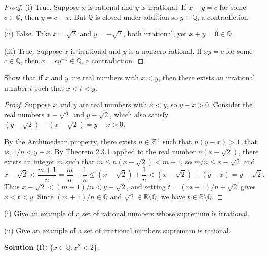\begin{proof}
    (i) True. Suppose $x$ is rational and $y$ is irrational.
    If $x + y = c$ for some $c \in \mathbb{Q}$, then $y = c - x$.
    But $\mathbb{Q}$ is closed under addition so $y \in \mathbb{Q}$, a contradiction.

    (ii) False. Take $x = \sqrt{2}$ and $y = -\sqrt{2}$, both irrational, yet $x + y = 0 \in \mathbb{Q}$.

    (iii) True. Suppose $x$ is irrational and $y$ is a nonzero rational.
    If $xy = c$ for some $c \in \mathbb{Q}$, then $x = c y^{-1} \in \mathbb{Q}$,
    a contradiction.
\end{proof}

\newpage
\begin{tcolorbox}[title=Problem 3, breakable]
    Show that if $x$ and $y$ are real numbers with $x < y$, then there exists 
    an irrational number $t$ such that $x < t < y$.
\end{tcolorbox}

\begin{proof}
    Suppose $x$ and $y$ are real numbers with $x < y$, so $y - x > 0$.
    Consider the real numbers $x - \sqrt{2}$ and $y - \sqrt{2}$, which also
    satisfy $(y - \sqrt{2}) - (x - \sqrt{2}) = y - x > 0$.

    By the Archimedean property, there exists $n \in \mathbb{Z}^+$ such that
    $n(y - x) > 1$, that is, $1/n < y - x$. By Theorem 2.3.1 applied to the
    real number $n(x - \sqrt{2})$, there exists an integer $m$ such that
    $m \le n(x - \sqrt{2}) < m + 1$, so $m/n \le x - \sqrt{2}$ and
    \[
        x - \sqrt{2} < \frac{m+1}{n} = \frac{m}{n} + \frac{1}{n}
        \le (x - \sqrt{2}) + \frac{1}{n} < (x - \sqrt{2}) + (y - x)
        = y - \sqrt{2}.
    \]
    Thus $x - \sqrt{2} < (m+1)/n < y - \sqrt{2}$, and setting
    $t = (m+1)/n + \sqrt{2}$ gives $x < t < y$. Since $(m+1)/n \in \mathbb{Q}$
    and $\sqrt{2} \in \mathbb{R} \setminus \mathbb{Q}$, we have
    $t \in \mathbb{R} \setminus \mathbb{Q}$.
\end{proof}

\begin{tcolorbox}[title=Problem 4, breakable]
    (i)  Give an example of a set of rational numbers whose supremum is irrational.

    (ii) Give an example of a set of irrational numbers supremum is rational.
\end{tcolorbox}

\textbf{Solution (i):} $\{x \in \mathbb{Q} : x^2 < 2\}$.

